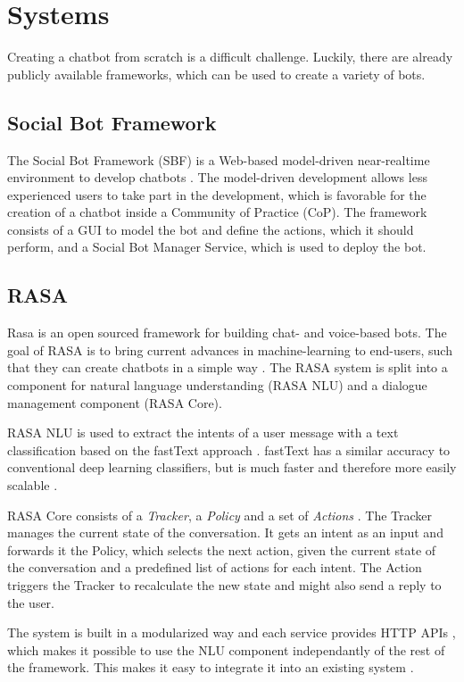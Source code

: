 \section{Systems} \label{lab:systems}
Creating a chatbot from scratch is a difficult challenge. Luckily, there are already publicly available frameworks, which can be used to create a variety of bots.

\subsection{Social Bot Framework}

The Social Bot Framework (SBF) is a Web-based model-driven near-realtime environment to develop chatbots \cite{NLKl19}. The model-driven development allows less experienced users to take part in the development, which is favorable for the creation of a chatbot inside a Community of Practice (CoP). The framework consists of a GUI to model the bot and define the actions, which it should perform, and a Social Bot Manager Service, which is used to deploy the bot.

\subsection{RASA}
Rasa is an open sourced framework for building chat- and voice-based bots. The goal of RASA is to bring current advances in machine-learning to end-users, such that they can create chatbots in a simple way \cite{BFPN17}. The RASA system is split into a component for natural language understanding (RASA NLU) and a dialogue management component (RASA Core).

RASA NLU is used to extract the intents of a user message with a text classification based on the fastText approach \cite{BFPN17}. fastText has a similar accuracy to conventional deep learning classifiers, but is much faster and therefore more easily scalable \cite{JGBM16}.

RASA Core consists of a \emph{Tracker}, a \emph{Policy} and a set of \emph{Actions} \cite{BFPN17}. The Tracker manages the current state of the conversation. It gets an intent as an input and forwards it the Policy, which selects the next action, given the current state of the conversation and a predefined list of actions for each intent. The Action triggers the Tracker to recalculate the new state and might also send a reply to the user.

The system is built in a modularized way and each service provides HTTP APIs \cite{BFPN17}, which makes it possible to use the NLU component independantly of the rest of the framework. This makes it easy to integrate it into an existing system \cite{RaKe19}.



